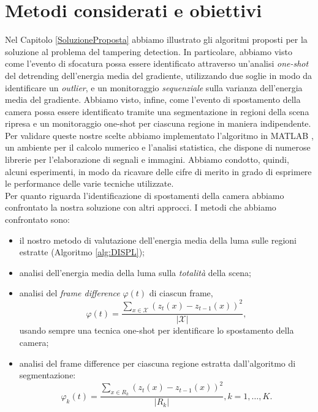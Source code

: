 \section{Metodi considerati e obiettivi}
\label{obiettivi}
Nel Capitolo \ref{SoluzioneProposta} abbiamo illustrato gli algoritmi proposti per la soluzione al problema del tampering detection.
In particolare, abbiamo visto come l'evento di sfocatura possa essere identificato attraverso un'analisi \textit{one-shot} del detrending dell'energia media del gradiente, utilizzando due soglie in modo da identificare un \textit{outlier}, e un monitoraggio \textit{sequenziale} sulla varianza dell'energia media del gradiente.
Abbiamo visto, infine, come l'evento di spostamento della camera possa essere identificato tramite una segmentazione in regioni della scena ripresa e un monitoraggio one-shot per ciascuna regione in maniera indipendente.\\
Per validare queste nostre scelte abbiamo implementato l'algoritmo in MATLAB \cite{matlab}, un ambiente per il calcolo numerico e l'analisi statistica, che dispone di numerose librerie per l'elaborazione di segnali e immagini.
Abbiamo condotto, quindi, alcuni esperimenti, in modo da ricavare delle cifre di merito in grado di esprimere le performance delle varie tecniche utilizzate.\\
Per quanto riguarda l'identificazione di spostamenti della camera abbiamo confrontato la nostra soluzione con altri approcci.
I metodi che abbiamo confrontato sono:
\begin{itemize}
	\item il nostro metodo di valutazione dell'energia media della luma sulle regioni estratte (Algoritmo \ref{alg:DISPL});
	\item analisi dell'energia media della luma sulla \textit{totalit\`a} della scena;
	\item analisi del \textit{frame difference} $\varphi(t)$ di ciascun frame, 
	\begin{equation}
	\label{eq:frameDiff}
	\varphi(t) = \frac{\sum_{x \in \mathcal{X}}(z_t(x) - z_{t-1}(x))^2}{|\mathcal{X}|},
	\end{equation}
	usando sempre una tecnica one-shot per identificare lo spostamento della camera;
	\item analisi del frame difference per ciascuna regione estratta dall'algoritmo di segmentazione:
	\begin{equation}
	\label{eq:frameDiffReg}
	\varphi_k(t) = \frac{\sum_{x \in R_k}(z_t(x) - z_{t-1}(x))^2}{|R_k|}, k=1,\dots,K.
	\end{equation}
\end{itemize}
